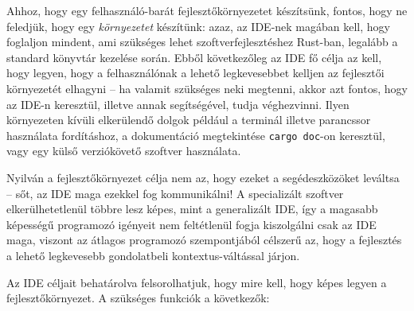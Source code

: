 




Ahhoz, hogy egy felhasználó-barát fejlesztőkörnyezetet készítsünk, fontos, hogy ne feledjük, hogy egy \emph{környezetet} készítünk: 
azaz, az IDE-nek magában kell, hogy foglaljon mindent, ami szükséges lehet szoftverfejlesztéshez Rust-ban, legalább a standard könyvtár kezelése során. 
Ebből következőleg az IDE fő célja az kell, hogy legyen, hogy a felhasználónak a lehető legkevesebbet kelljen az fejlesztői környezetét elhagyni -- 
ha valamit szükséges neki megtenni, akkor azt fontos, hogy az IDE-n keresztül, illetve annak segítségével, tudja véghezvinni. 
Ilyen környezeten kívüli elkerülendő dolgok például a terminál illetve parancssor használata fordításhoz, 
a dokumentáció megtekintése \texttt{cargo doc}-on keresztül, vagy egy külső verziókövető szoftver használata.

Nyilván a fejlesztőkörnyezet célja nem az, hogy ezeket a segédeszközöket leváltsa -- sőt, az IDE maga ezekkel fog kommunikálni! 
A specializált szoftver elkerülhetetlenül többre lesz képes, mint a generalizált IDE, így a magasabb képességű programozó igényeit nem feltétlenül fogja kiszolgálni csak az IDE maga, 
viszont az átlagos programozó szempontjából célszerű az, hogy a fejlesztés a lehető legkevesebb gondolatbeli kontextus-váltással járjon.

Az IDE céljait behatárolva felsorolhatjuk, hogy mire kell, hogy képes legyen a fejlesztőkörnyezet. 
A szükséges funkciók a következők:


